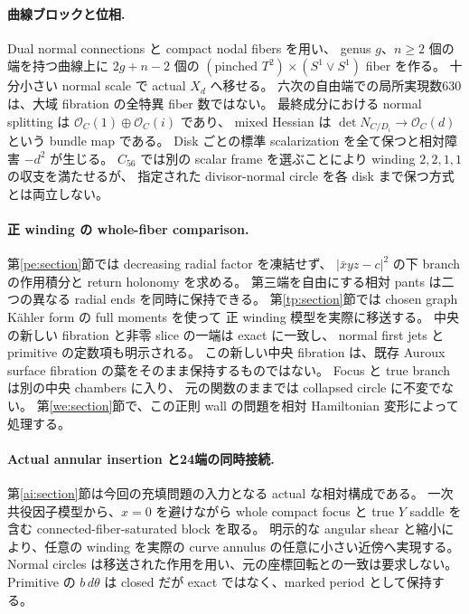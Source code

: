 \documentclass[11pt,a4paper]{article}
\theoremstyle{definition}
\begin{document}
\paragraph{曲線ブロックと位相.}
Dual normal connections と compact nodal fibers を用い、
genus $g$、$n\ge2$ 個の端を持つ曲線上に
$2g+n-2$ 個の $(\text{pinched }T^2)\times(S^1\vee S^1)$ fiber を作る。
十分小さい normal scale で actual $X_d$ へ移せる。
六次の自由端での局所実現数630は、大域 fibration の全特異 fiber 数ではない。
最終成分における normal splitting は
$\mathcal O_C(1)\oplus\mathcal O_C(i)$ であり、
mixed Hessian は $\det N_{C/D_i}\to\mathcal O_C(d)$ という bundle map である。
Disk ごとの標準 scalarization を全て保つと相対障害 $-d^2$ が生じる。
$C_{56}$ では別の scalar frame を選ぶことにより winding $2,2,1,1$ の収支を満たせるが、
指定された divisor-normal circle を各 disk まで保つ方式とは両立しない。

\paragraph{正 winding の whole-fiber comparison.}
第\ref{pe:section}節では decreasing radial factor を凍結せず、
$|\bar xyz-c|^2$ の下 branch の作用積分と return holonomy を求める。
第三端を自由にする相対 pants は二つの異なる radial ends を同時に保持できる。
第\ref{tp:section}節では chosen graph Kähler form の full moments を使って
正 winding 模型を実際に移送する。
中央の新しい fibration と非零 slice の一端は exact に一致し、
normal first jets と primitive の定数項も明示される。
この新しい中央 fibration は、既存 Auroux surface fibration の葉をそのまま保持するものではない。
Focus と true branch は別の中央 chambers に入り、
元の関数のままでは collapsed circle に不変でない。
第\ref{we:section}節で、この正則 wall の問題を相対 Hamiltonian 変形によって処理する。

\paragraph{Actual annular insertion と24端の同時接続.}
第\ref{ai:section}節は今回の充填問題の入力となる actual な相対構成である。
一次共役因子模型から、$x=0$ を避けながら whole compact focus と true $Y$ saddle を含む
connected-fiber-saturated block を取る。
明示的な angular shear と縮小により、任意の winding を実際の curve annulus の任意に小さい近傍へ実現する。
Normal circles は移送された作用を用い、元の座標回転との一致は要求しない。
Primitive の $b\,d\theta$ は closed だが exact ではなく、marked period として保持する。
\end{document}
